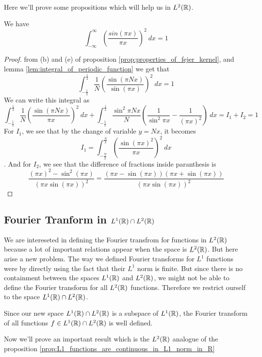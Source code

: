 Here we'll prove some propositions which will help us in $L^2(\mathbb R)$. 
\begin{proposition}
  We have $$\int_{-\infty}^{\infty} \left(\frac{sin(\pi x)}{\pi x}\right)^2 \ dx = 1$$
\end{proposition}
\begin{proof}
  from (b) and (e) of proposition \ref{prop:properties_of_fejer_kernel}, and lemma \ref{lem:integral_of_periodic_function} we get that $$\int_{-\frac{1}{2}}^{\frac{1}{2}} \frac{1}{N} \left(\frac{\sin(\pi Nx)}{\sin (\pi x)}\right)^2 \ dx = 1$$
  We can write this integral as $$\int_{-\frac{1}{2}}^{\frac{1}{2}} \frac{1}{N} \left(\frac{\sin(\pi Nx)}{\pi x}\right)^2 \ dx + \int_{-\frac{1}{2}}^{\frac{1}{2}} \frac{\sin^2 \pi Nx}{N} \left( \frac{1}{\sin^2 \pi x} - \frac{1}{(\pi x)^2} \right) \ dx = I_1 + I_2 = 1 $$
  For $I_1$, we see that by the change of variable $y = Nx$, it becomes $$I_1 = \int_{-\frac{N}{2}}^{\frac{N}{2}} \left(\frac{\sin(\pi x)^2}{\pi x}\right)^2 \ dx $$. 
  And for $I_2$, we see that the difference of fractions inside paranthesis is $$\frac{(\pi x)^2 - \sin^2(\pi x)}{(\pi x \sin(\pi x))^2} = \frac{(\pi x - \sin(\pi x))(\pi x + \sin(\pi x))}{(\pi x \sin(\pi x))^2}$$
\end{proof}



\subsection{Fourier Tranform in $L^1(\mathbb R) \cap 
L^2(\mathbb R)$}
We are intereseted in defining the Fourier transfrom for functions in $L^2(\mathbb R)$ because a lot of important relations appear when the space is $L^2(\mathbb R)$. But here arise a new problem. The way we defined Fourier transforms for $L^1$ functions were by directly using the fact that their $L^1$ norm is finite. But since there is no containment between the spaces $L^1(\mathbb R)$ and $L^2(\mathbb R)$, we might not be able to define the Fourier transform for all $L^2(\mathbb R)$ functions. Therefore we restrict ourself to the space $L^1(\mathbb R) \cap L^2(\mathbb R)$. 

Since our new space $L^1(\mathbb R) \cap L^2(\mathbb R)$ is a subspace of $L^1(\mathbb R)$, the Fourier transform of all functions $f \in L^1(\mathbb R) \cap L^2(\mathbb R)$ is well defined. 

Now we'll prove an important result which is the $L^2(\mathbb R)$ analogue of the proposition \ref{prop:L1_functions_are_continuous_in_L1_norm_in_R}

